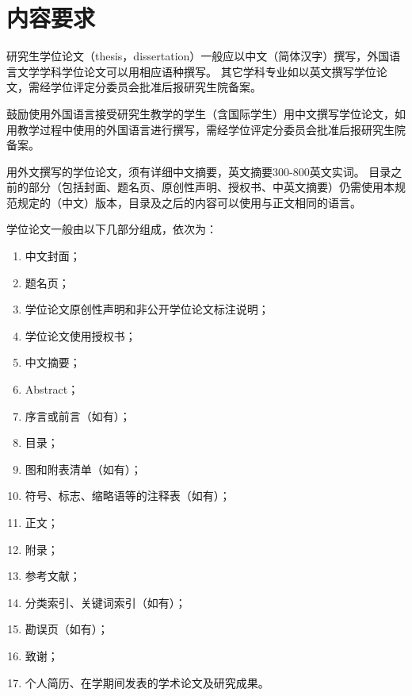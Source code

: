 \chapter{内容要求}

研究生学位论文（thesis，dissertation）一般应以中文（简体汉字）撰写，外国语言文学学科学位论文可以用相应语种撰写。
其它学科专业如以英文撰写学位论文，需经学位评定分委员会批准后报研究生院备案。

鼓励使用外国语言接受研究生教学的学生（含国际学生）用中文撰写学位论文，如用教学过程中使用的外国语言进行撰写，需经学位评定分委员会批准后报研究生院备案。

用外文撰写的学位论文，须有详细中文摘要，英文摘要300-800英文实词。
目录之前的部分（包括封面、题名页、原创性声明、授权书、中英文摘要）仍需使用本规范规定的（中文）版本，目录及之后的内容可以使用与正文相同的语言。

学位论文一般由以下几部分组成，依次为：

\begin{enumerate}
    \item 中文封面；
    \item 题名页；
    \item 学位论文原创性声明和非公开学位论文标注说明；
    \item 学位论文使用授权书；
    \item 中文摘要；
    \item Abstract；
    \item 序言或前言（如有）；
    \item 目录；
    \item 图和附表清单（如有）；
    \item 符号、标志、缩略语等的注释表（如有）；
    \item 正文；
    \item 附录；
    \item 参考文献；
    \item 分类索引、关键词索引（如有）；
    \item 勘误页（如有）；
    \item 致谢；
    \item 个人简历、在学期间发表的学术论文及研究成果。 
\end{enumerate}
